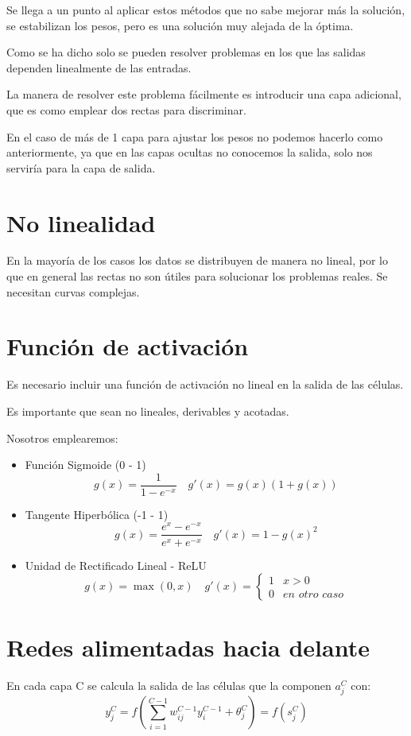 \documentclass[12pt, twoside, openright]{report} %
\begin{document}
Se llega a un punto al aplicar estos métodos que no sabe mejorar más la solución, se estabilizan los pesos, pero es una solución muy alejada de la óptima.

Como se ha dicho solo se pueden resolver problemas en los que las salidas dependen linealmente de las entradas.

La manera de resolver este problema fácilmente es introducir una capa adicional, que es como emplear dos rectas para discriminar.

En el caso de más de 1 capa para ajustar los pesos no podemos hacerlo como anteriormente, ya que en las capas ocultas no conocemos la salida, solo nos serviría para la capa de salida.

\section{No linealidad}
En la mayoría de los casos los datos se distribuyen de manera no lineal, por lo que en general las rectas no son útiles para solucionar los problemas reales. Se necesitan curvas complejas.

\section{Función de activación}
Es necesario incluir una función de activación no lineal en la salida de las células. 

Es importante que sean no lineales, derivables y acotadas.
\pagebreak

Nosotros emplearemos:
\begin{itemize}
	\item Función Sigmoide (0 - 1)
	      $$g(x)=\frac{1}{1-e^{-x}}\quad g'(x)=g(x)(1+g(x))$$
	\item Tangente Hiperbólica (-1 - 1) $$g(x)=\frac{e^x-e^{-x}}{e^x+e^{-x}} \quad g'(x)=1-g(x)^2$$
	\item Unidad de Rectificado Lineal - ReLU $$g(x)=\max(0,x) \quad g'(x)= \begin{cases}1 & x > 0\\0 & \textit{en otro caso}\end{cases}$$
\end{itemize}

\section{Redes alimentadas hacia delante}
En cada capa C se calcula la salida de las células que la componen $a^C_j$ con: 
$$y^C_j=f\left(\sum^{C-1}_{i=1} w^{C-1}_{ij}y^{C-1}_i+\theta_j^C\right)=f(s^{C}_{j})$$
\end{document}
